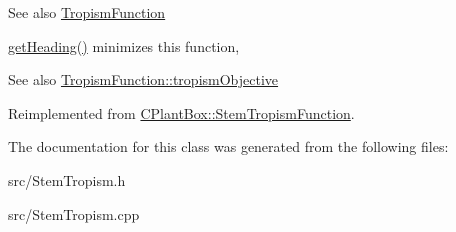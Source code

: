 \begin{DoxySeeAlso}{See also}
\hyperlink{classCPlantBox_1_1TropismFunction}{Tropism\+Function}
\end{DoxySeeAlso}
\hyperlink{classCPlantBox_1_1StemTropismFunction_ac72f7ad1200d1defbb3c9b20e20d1f62}{get\+Heading()} minimizes this function, \begin{DoxySeeAlso}{See also}
\hyperlink{classCPlantBox_1_1TropismFunction_a4f2c79fff55d1398c98a070dd8ebbe08}{Tropism\+Function\+::tropism\+Objective} 
\end{DoxySeeAlso}


Reimplemented from \hyperlink{classCPlantBox_1_1StemTropismFunction_a86dc37330cbec72042352dcce88756ae}{C\+Plant\+Box\+::\+Stem\+Tropism\+Function}.



The documentation for this class was generated from the following files\+:\begin{DoxyCompactItemize}
\item 
src/Stem\+Tropism.\+h\item 
src/Stem\+Tropism.\+cpp\end{DoxyCompactItemize}
